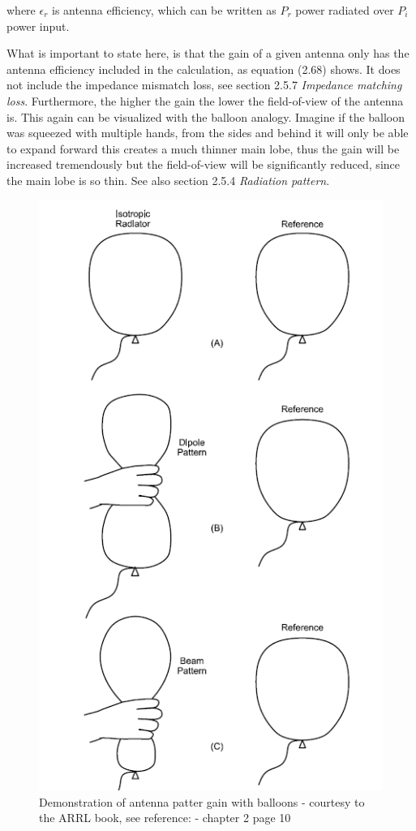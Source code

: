 where $\epsilon_r$ is antenna efficiency, which can be written as $P_r$ power radiated over $P_i$ power input.

What is important to state here, is that the gain of a given antenna only has the antenna efficiency included in the calculation, as equation (2.68) shows. It does not include the impedance mismatch loss, see section 2.5.7 \textit{Impedance matching loss}. Furthermore, the higher the gain the lower the field-of-view of the antenna is. This again can be visualized with the balloon analogy. Imagine if the balloon was squeezed with multiple hands, from the sides and behind it will only be able to expand forward this creates a much thinner main lobe, thus the gain will be increased tremendously but the field-of-view will be significantly reduced, since the main lobe is so thin. See also section 2.5.4 \textit{Radiation pattern}.   

\begin{figure}[h]
\centering
\includegraphics[scale=0.8]{figures/BalloonDirectivity.PNG}
\caption{Demonstration of antenna patter gain with balloons - courtesy to the ARRL book, see reference: \cite{ARRL} - chapter 2 page 10}
\end{figure}

